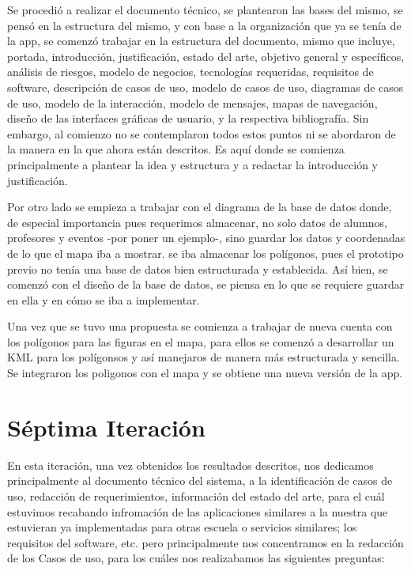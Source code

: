\noindent
Se procedió a realizar el documento técnico, se plantearon las bases del mismo, se pensó en la estructura del mismo, y con base a la organización que ya se tenía de la app, se comenzó trabajar en la estructura del documento, mismo que incluye, portada, introducción, justificación, estado del arte, objetivo general y específicos, análisis de riesgos, modelo de negocios, tecnologías requeridas, requisitos de software, descripción de casos de uso, modelo de casos de uso, diagramas de casos de uso, modelo de la interacción, modelo de mensajes, mapas de navegación, diseño de las interfaces gráficas de usuario, y la respectiva bibliografía. Sin embargo, al comienzo no se contemplaron todos estos puntos ni se abordaron de la manera en la que ahora están descritos. Es aquí donde se comienza principalmente a plantear la idea y estructura y a redactar la introducción y justificación. 

\noindent
Por otro lado se empieza a trabajar con el diagrama de la base de datos donde, de especial importancia pues requerimos almacenar, no solo datos de alumnos, profesores y eventos -por poner un ejemplo-, sino guardar los datos y coordenadas de lo que el mapa iba a mostrar. se iba almacenar los polígonos, pues el prototipo previo no tenía una base de datos bien estructurada y establecida. Así bien, se comenzó con el diseño de la base de datos, se piensa en lo que se requiere guardar en ella y en cómo se iba a implementar. 

\noindent
Una vez que se tuvo una propuesta se comienza a trabajar de nueva cuenta con los polígonos para las figuras en el mapa, para ellos se comenzó a desarrollar un KML para los polígonsos y así manejaros de manera más estructurada y sencilla. 
Se integraron los poligonos con el mapa y se obtiene una nueva versión de la app. 


\section{Séptima Iteración}

\noindent
En esta iteración, una vez obtenidos los resultados descritos, nos dedicamos principalmente al documento técnico del sistema, a la identificación de casos de uso, redacción de requerimientos, información del estado del arte, para el cuál estuvimos recabando infromación de las aplicaciones similares a la nuestra que estuvieran ya implementadas para otras escuela o servicios similares; los requisitos del software, etc. pero principalmente nos concentramos en la redacción de los Casos de uso, para los cuáles nos realizabamos las siguientes preguntas:

